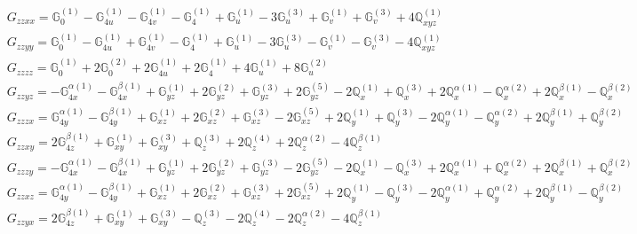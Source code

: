 \documentclass[fleqn,8pt,landscape]{jsarticle}
\begin{document}
\begin{align*}
& G_{zzxx} = \mathbb{G}_{0}^{(1)} - \mathbb{G}_{4u}^{(1)} - \mathbb{G}_{4v}^{(1)} - \mathbb{G}_{4}^{(1)} + \mathbb{G}_{u}^{(1)} - 3 \mathbb{G}_{u}^{(3)} + \mathbb{G}_{v}^{(1)} + \mathbb{G}_{v}^{(3)} + 4 \mathbb{Q}_{xyz}^{(1)} \\
& G_{zzyy} = \mathbb{G}_{0}^{(1)} - \mathbb{G}_{4u}^{(1)} + \mathbb{G}_{4v}^{(1)} - \mathbb{G}_{4}^{(1)} + \mathbb{G}_{u}^{(1)} - 3 \mathbb{G}_{u}^{(3)} - \mathbb{G}_{v}^{(1)} - \mathbb{G}_{v}^{(3)} - 4 \mathbb{Q}_{xyz}^{(1)} \\
& G_{zzzz} = \mathbb{G}_{0}^{(1)} + 2 \mathbb{G}_{0}^{(2)} + 2 \mathbb{G}_{4u}^{(1)} + 2 \mathbb{G}_{4}^{(1)} + 4 \mathbb{G}_{u}^{(1)} + 8 \mathbb{G}_{u}^{(2)} \\
& G_{zzyz} = - \mathbb{G}_{4x}^{\alpha(1)} - \mathbb{G}_{4x}^{\beta(1)} + \mathbb{G}_{yz}^{(1)} + 2 \mathbb{G}_{yz}^{(2)} + \mathbb{G}_{yz}^{(3)} + 2 \mathbb{G}_{yz}^{(5)} - 2 \mathbb{Q}_{x}^{(1)} + \mathbb{Q}_{x}^{(3)} + 2 \mathbb{Q}_{x}^{\alpha(1)} - \mathbb{Q}_{x}^{\alpha(2)} + 2 \mathbb{Q}_{x}^{\beta(1)} - \mathbb{Q}_{x}^{\beta(2)} \\
& G_{zzzx} = \mathbb{G}_{4y}^{\alpha(1)} - \mathbb{G}_{4y}^{\beta(1)} + \mathbb{G}_{xz}^{(1)} + 2 \mathbb{G}_{xz}^{(2)} + \mathbb{G}_{xz}^{(3)} - 2 \mathbb{G}_{xz}^{(5)} + 2 \mathbb{Q}_{y}^{(1)} + \mathbb{Q}_{y}^{(3)} - 2 \mathbb{Q}_{y}^{\alpha(1)} - \mathbb{Q}_{y}^{\alpha(2)} + 2 \mathbb{Q}_{y}^{\beta(1)} + \mathbb{Q}_{y}^{\beta(2)} \\
& G_{zzxy} = 2 \mathbb{G}_{4z}^{\beta(1)} + \mathbb{G}_{xy}^{(1)} + \mathbb{G}_{xy}^{(3)} + \mathbb{Q}_{z}^{(3)} + 2 \mathbb{Q}_{z}^{(4)} + 2 \mathbb{Q}_{z}^{\alpha(2)} - 4 \mathbb{Q}_{z}^{\beta(1)} \\
& G_{zzzy} = - \mathbb{G}_{4x}^{\alpha(1)} - \mathbb{G}_{4x}^{\beta(1)} + \mathbb{G}_{yz}^{(1)} + 2 \mathbb{G}_{yz}^{(2)} + \mathbb{G}_{yz}^{(3)} - 2 \mathbb{G}_{yz}^{(5)} - 2 \mathbb{Q}_{x}^{(1)} - \mathbb{Q}_{x}^{(3)} + 2 \mathbb{Q}_{x}^{\alpha(1)} + \mathbb{Q}_{x}^{\alpha(2)} + 2 \mathbb{Q}_{x}^{\beta(1)} + \mathbb{Q}_{x}^{\beta(2)} \\
& G_{zzxz} = \mathbb{G}_{4y}^{\alpha(1)} - \mathbb{G}_{4y}^{\beta(1)} + \mathbb{G}_{xz}^{(1)} + 2 \mathbb{G}_{xz}^{(2)} + \mathbb{G}_{xz}^{(3)} + 2 \mathbb{G}_{xz}^{(5)} + 2 \mathbb{Q}_{y}^{(1)} - \mathbb{Q}_{y}^{(3)} - 2 \mathbb{Q}_{y}^{\alpha(1)} + \mathbb{Q}_{y}^{\alpha(2)} + 2 \mathbb{Q}_{y}^{\beta(1)} - \mathbb{Q}_{y}^{\beta(2)} \\
& G_{zzyx} = 2 \mathbb{G}_{4z}^{\beta(1)} + \mathbb{G}_{xy}^{(1)} + \mathbb{G}_{xy}^{(3)} - \mathbb{Q}_{z}^{(3)} - 2 \mathbb{Q}_{z}^{(4)} - 2 \mathbb{Q}_{z}^{\alpha(2)} - 4 \mathbb{Q}_{z}^{\beta(1)} \\

\end{align*}
\end{document}
